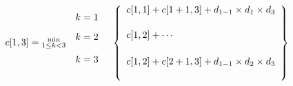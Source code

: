 \documentclass{report}
\begin{document}
	\begin{eqnarray}
		\begin{array}{c}
			\\
			c[1,3] = \substack{\text{min}\\1\leq k < 3}\\
			\\
		\end{array}&
		\begin{array}{c}
			k=1\\[0.3cm]
			k=2\\[0.4cm]
			k=3\\[0.3cm]
		\end{array}&
		\left\{
		\begin{array}{l}
			c[1,1]+ c[1 + 1,3] + d_{1-1} \times d_1 \times d_3\\[0.5cm]
			c[1,2] + \cdots \\[0.55cm]
			c[1,2] + c[2 + 1,3] + d_{1-1} \times d_2 \times d_3 \\[0.5cm]
		\end{array}
		\right\}\notag\\[0.7cm]
	\end{eqnarray}
	

	
\end{document}
